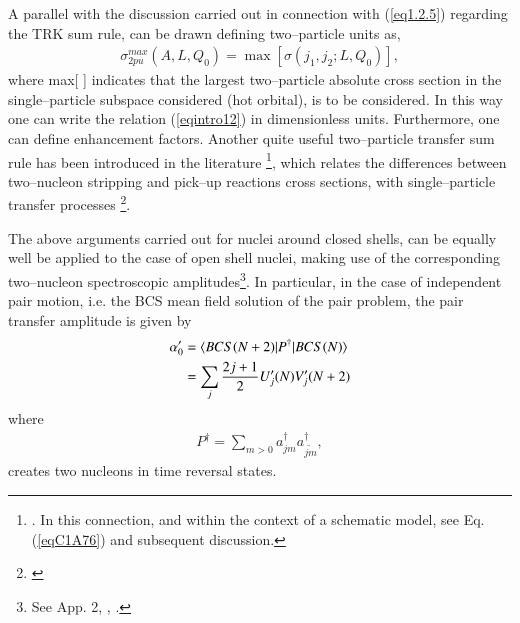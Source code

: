 A parallel with the discussion carried out in connection with (\ref{eq1.2.5}) regarding the TRK sum rule, can be drawn defining two--particle units as,
\begin{align}
\sigma^{max}_{2pu}(A,L,Q_0)=\max \left[\sigma(j_1,j_2;L,Q_0)\right],
\end{align}
where max[ ] indicates that the largest two--particle absolute cross section in the single--particle subspace considered (hot orbital), is to be considered. In this way one can write the relation (\ref{eqintro12}) in dimensionless units. Furthermore, one can define enhancement factors. Another quite useful two--particle transfer sum rule has been introduced in the literature \footnote{\cite{Bayman:72}. In this connection, and within the context of a schematic model, see Eq. (\ref{eqC1A76}) and subsequent discussion.}, which relates the differences between two--nucleon stripping and pick--up reactions cross sections, with single--particle transfer processes \footnote{\cite{Lanford:77}}.


The above arguments carried out for nuclei around closed shells, can be equally well be applied to the case of open shell nuclei, making use of the corresponding two--nucleon spectroscopic amplitudes\footnote{See App. 2, \cite{Broglia:73}, \cite{Yoshida:62}.}.
In particular, in the case of independent pair motion, i.e. the BCS mean field solution of the pair problem, the pair transfer amplitude is given by
\begin{align}\label{eq1.2.14}
\nonumber \alpha_0'&=\langle {BCS(N+2)|P^\dagger|BCS(N)} \rangle\\
&=\sum_{j}\frac{2j+1}{2}U'_j(N)V'_j(N+2)
\end{align}
where
\begin{align}\label{eq1.2.15}
P^\dagger=\sum_{m>0}a^\dagger_{jm}a^\dagger_{\widetilde{jm}},
\end{align}
creates two nucleons in time reversal states.

